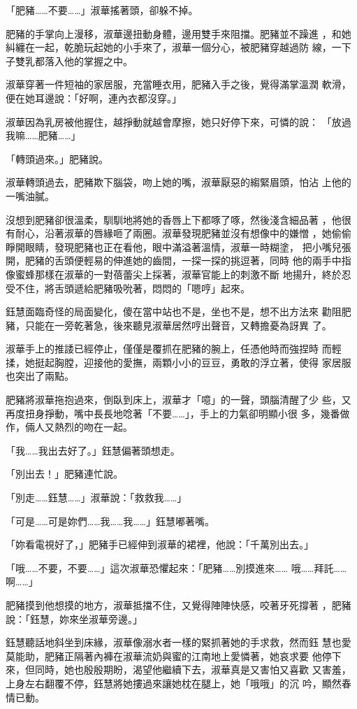 「肥豬……不要……」淑華搖著頭，卻躲不掉。

肥豬的手掌向上漫移，淑華邊扭動身體，邊用雙手來阻擋。肥豬並不躁進
，和她糾纏在一起，乾脆玩起她的小手來了，淑華一個分心，被肥豬穿越過防
線，一下子雙乳都落入他的掌握之中。

淑華穿著一件短袖的家居服，充當睡衣用，肥豬入手之後，覺得滿掌溫潤
軟滑，便在她耳邊說：「好啊，連內衣都沒穿。」

淑華因為乳房被他握住，越掙動就越會摩擦，她只好停下來，可憐的說：
「放過我嘛……肥豬……」

「轉頭過來。」肥豬說。

淑華轉頭過去，肥豬欺下腦袋，吻上她的嘴，淑華厭惡的縐緊眉頭，怕沾
上他的一嘴油膩。

沒想到肥豬卻很溫柔，馴馴地將她的香唇上下都啄了啄，然後淺含細品著
，他很有耐心，沿著淑華的唇緣咂了兩圈。淑華發現肥豬並沒有想像中的嫌憎
，她偷偷睜開眼睛，發現肥豬也正在看他，眼中滿溢著溫情，淑華一時糊塗，
把小嘴兒張開，肥豬的舌頭便輕易的伸進她的齒間，一探一探的挑逗著，同時
他的兩手中指像蜜蜂那樣在淑華的一對蓓蕾尖上採著，淑華官能上的刺激不斷
地揚升，終於忍受不住，將舌頭遞給肥豬吸吮著，悶悶的「嗯哼」起來。

鈺慧面臨奇怪的局面變化，傻在當中站也不是，坐也不是，想不出方法來
勸阻肥豬，只能在一旁乾著急，後來聽見淑華居然哼出聲音，又轉擔憂為訝異
了。

淑華手上的推諉已經停止，僅僅是覆抓在肥豬的腕上，任憑他時而強捏時
而輕揉，她挺起胸膛，迎接他的愛撫，兩顆小小的豆豆，勇敢的浮立著，使得
家居服也突出了兩點。

肥豬將淑華拖抱過來，倒臥到床上，淑華才「噫」的一聲，頭腦清醒了少
些，又再度扭身掙動，嘴中長長地唸著「不要……」，手上的力氣卻明顯小很
多，幾番做作，倆人又熱烈的吻在一起。

「我……我出去好了。」鈺慧偏著頭想走。

「別出去！」肥豬連忙說。

「別走……鈺慧……」淑華說：「救救我……」

「可是……可是妳們……我……我……」鈺慧嘟著嘴。

「妳看電視好了，」肥豬手已經伸到淑華的裙裡，他說：「千萬別出去。」

「哦……不要，不要……」這次淑華恐懼起來：「肥豬……別摸進來……
哦……拜託……啊……」

肥豬摸到他想摸的地方，淑華抵擋不住，又覺得陣陣快感，咬著牙死撐著
，肥豬說：「鈺慧，妳來坐淑華旁邊。」

鈺慧聽話地斜坐到床緣，淑華像溺水者一樣的緊抓著她的手求救，然而鈺
慧也愛莫能助，肥豬正隔著內褲在淑華流奶與蜜的江南地上愛憐著，她哀求要
他停下來，但同時，她也殷殷期盼，渴望他繼續下去，淑華真是又害怕又喜歡
又害羞，上身左右翻覆不停，鈺慧將她摟過來讓她枕在腿上，她「哦哦」的沉
吟，顯然春情已動。

